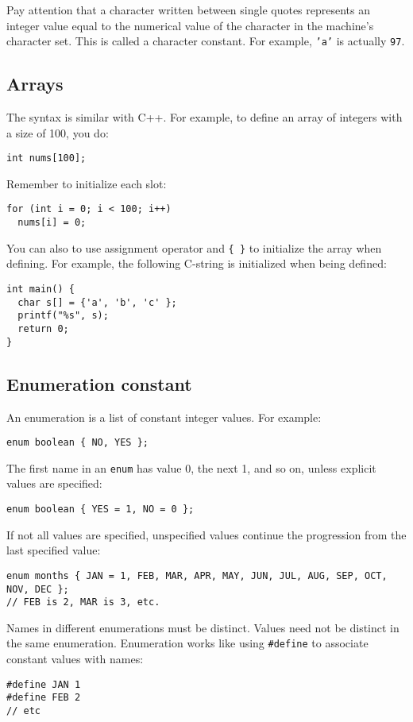 \documentclass[12pt]{article}
\begin{document}
Pay attention that a character written between single quotes represents an integer value equal to the numerical value of the character in the machine's character set. This is called a character constant. For example, \texttt{'a'} is actually \texttt{97}.
\subsection{Arrays}
\label{sec:orgc180495}
The syntax is similar with C++. For example, to define an array of integers with a size of 100, you do:
\begin{verbatim}
int nums[100];
\end{verbatim}
Remember to initialize each slot:
\begin{verbatim}
for (int i = 0; i < 100; i++)
  nums[i] = 0;
\end{verbatim}

You can also to use assignment operator and \texttt{\{ \}} to initialize the array when defining. For example, the following C-string is initialized when being defined:
\begin{verbatim}
int main() {
  char s[] = {'a', 'b', 'c' };
  printf("%s", s);
  return 0;
}
\end{verbatim}
\subsection{Enumeration constant}
\label{sec:orgb020127}
An enumeration is a list of constant integer values. For example:
\begin{verbatim}
enum boolean { NO, YES };
\end{verbatim}
The first name in an \texttt{enum} has value 0, the next 1, and so on, unless explicit values are specified:
\begin{verbatim}
enum boolean { YES = 1, NO = 0 };
\end{verbatim}

If not all values are specified, unspecified values continue the progression from the last specified value:
\begin{verbatim}
enum months { JAN = 1, FEB, MAR, APR, MAY, JUN, JUL, AUG, SEP, OCT, NOV, DEC };
// FEB is 2, MAR is 3, etc.
\end{verbatim}

Names in different enumerations must be distinct. Values need not be distinct in the same enumeration. Enumeration works like using \texttt{\#define} to associate constant values with names:
\begin{verbatim}
#define JAN 1
#define FEB 2
// etc
\end{verbatim}
\end{document}
